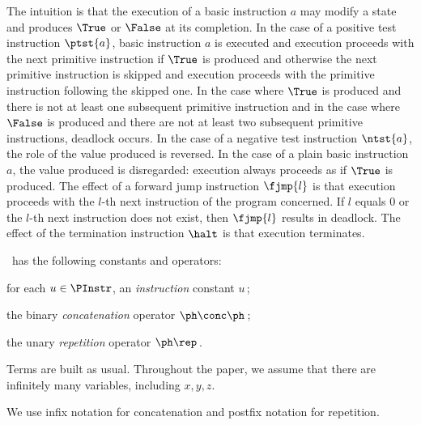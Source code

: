 \documentclass[fleqn]{llncs}
\begin{document}
The intuition is that the execution of a basic instruction $a$ may
modify a state and produces $\True$ or $\False$ at its completion.
In the case of a positive test instruction $\ptst{a}$, basic instruction
$a$ is executed and execution proceeds with the next primitive
instruction if $\True$ is produced and otherwise the next primitive
instruction is skipped and execution proceeds with the primitive
instruction following the skipped one.
In the case where $\True$ is produced and there is not at least one
subsequent primitive instruction and in the case where $\False$ is
produced and there are not at least two subsequent primitive
instructions, deadlock occurs.
In the case of a negative test instruction $\ntst{a}$, the role of the
value produced is reversed.
In the case of a plain basic instruction $a$, the value produced is
disregarded: execution always proceeds as if $\True$ is produced.
The effect of a forward jump instruction $\fjmp{l}$ is that execution
proceeds with the $l$-th next instruction of the program concerned.
If $l$ equals $0$ or the $l$-th next instruction does not exist, then
$\fjmp{l}$ results in deadlock.
The effect of the termination instruction $\halt$ is that execution
terminates.

\PGA\ has the following constants and operators:
\begin{iteml}
\item
for each $u \in \PInstr$, an \emph{instruction} constant $u$\,;
\item
the binary \emph{concatenation} operator $\ph \conc \ph$\,;
\item
the unary \emph{repetition} operator $\ph\rep$\,.
\end{iteml}
Terms are built as usual.
Throughout the paper, we assume that there are infinitely many
variables, including $x,y,z$.

We use infix notation for concatenation and postfix notation for
repetition.
\end{document}
